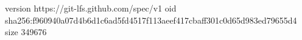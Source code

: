 version https://git-lfs.github.com/spec/v1
oid sha256:f960940a07d4b6d1c6ad5fd4517f113aeef417cbaff301c0d65d983ed79655d4
size 349676
